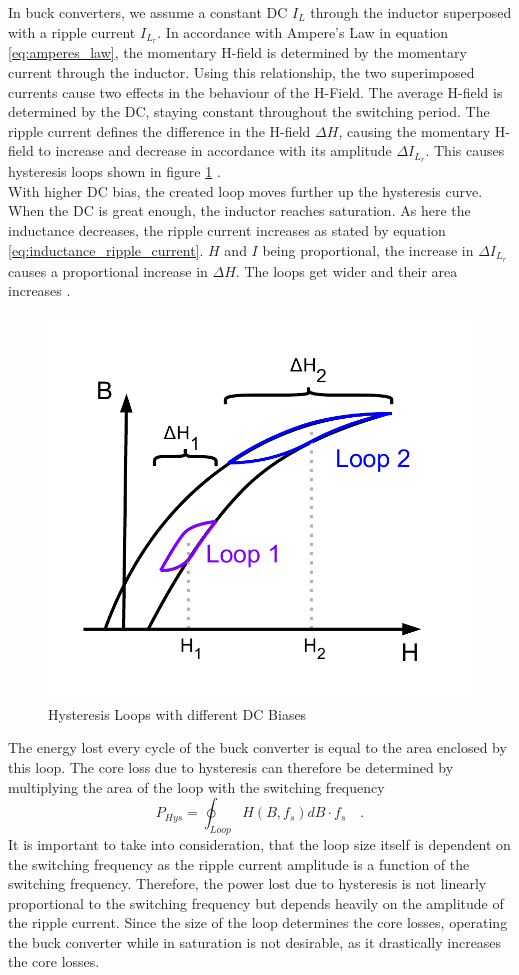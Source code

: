 In buck converters, we assume a constant \ac{DC} $I_L$ through the inductor superposed with a ripple current $I_{L_r}$. In accordance with Ampere's Law in equation \ref{eq:amperes_law}, the momentary H-field is determined by the momentary current through the inductor. 
Using this relationship, the two superimposed currents cause two effects in the behaviour of the H-Field. The average H-field is determined by the \ac{DC}, staying constant throughout the switching period. The ripple current defines the difference in the H-field $\Delta H$, causing the momentary H-field to increase and decrease in accordance with its amplitude $\Delta I_{L_r}$. This causes hysteresis loops shown in figure \ref{fig:DC_Bias_Hysteresis} \cite{dixon2001magnetics}.\\
With higher \ac{DC} bias, the created loop moves further up the hysteresis curve. When the \ac{DC} is great enough, the inductor reaches saturation. As here the inductance decreases, the ripple current increases as stated by equation \ref{eq:inductance_ripple_current}. $H$ and $I$ being proportional, the increase in $\Delta I_{L_r}$ causes a proportional increase in $\Delta H$. The loops get wider and their area increases \cite{hurstWurthElektronikExpands2024}.
\begin{figure}[H]
    \centering
    \includegraphics[width=.5\linewidth]{Bilder/Kapitel2/Hysteresis_Loops.pdf}
    \caption{Hysteresis Loops with different DC Biases}
    \label{fig:DC_Bias_Hysteresis}
\end{figure}
The energy lost every cycle of the buck converter is equal to the area enclosed by this loop. The core loss due to hysteresis can therefore be determined by multiplying the area of the loop with the switching frequency
\begin{equation}
    P_{Hys} = \oint_{Loop} H\left(B,f_s\right)  dB \cdot f_s \quad\text{.}
\end{equation}
It is important to take into consideration, that the loop size itself is dependent on the switching frequency as the ripple current amplitude is a function of the switching frequency. Therefore, the power lost due to hysteresis is not linearly proportional to the switching frequency but depends heavily on the amplitude of the ripple current. Since the size of the loop determines the core losses, operating the buck converter while in saturation is not desirable, as it drastically increases the core losses.

